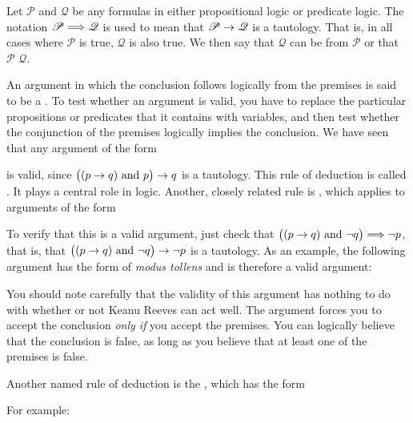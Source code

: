 \begin{definition}
Let $\mathscr{P}$ and $\mathscr{Q}$ be any formulas in either
propositional logic or predicate logic.  The notation
$\mathscr{P}\Longrightarrow\mathscr{Q}$ is used to mean that
$\mathscr{P}\rightarrow\mathscr{Q}$ is a tautology.  That is,
in all cases where $\mathscr{P}$ is true, $\mathscr{Q}$ is
also true.  We then say that $\mathscr{Q}$ can be
 from $\mathscr{P}$ or that
$\mathscr{P}$  $\mathscr{Q}$.
\end{definition}

An argument in which the conclusion follows logically from the
premises is said to be a .  To test whether
an argument is valid, you have to replace the particular propositions
or predicates that it contains with variables, and then test
whether the conjunction of the premises logically implies the
conclusion.  We have seen that any argument of the form
\begin{center}
\end{center}
is valid, since $\big((p\rightarrow q)\text{ and } p\big)\rightarrow q$ is a tautology.
This rule of deduction is called .  It plays a central
role in logic.  Another, closely related rule is ,
which applies to arguments of the form
\begin{center}
\end{center}
To verify that this is a valid argument, just check that
$\big((p\rightarrow q)\text{ and } \lnot q\big)\Longrightarrow \lnot p$, that is, that
$\big((p\rightarrow q)\text{ and } \lnot q\big)\rightarrow \lnot p$ is a tautology.
As an example, the following argument has the form of \textit{modus tollens}
and is therefore a valid argument:
\begin{center}
\end{center}
You should note carefully that the validity of this argument has nothing
to do with whether or not Keanu Reeves can act well.  The argument forces
you to accept the conclusion \emph{only if} you accept the premises.
You can logically believe that the conclusion is false, as long as
you believe that at least one of the premises is false.

Another named rule of deduction is the , which has the form
\begin{center}
\end{center}
For example:
\begin{center}
\end{center}

